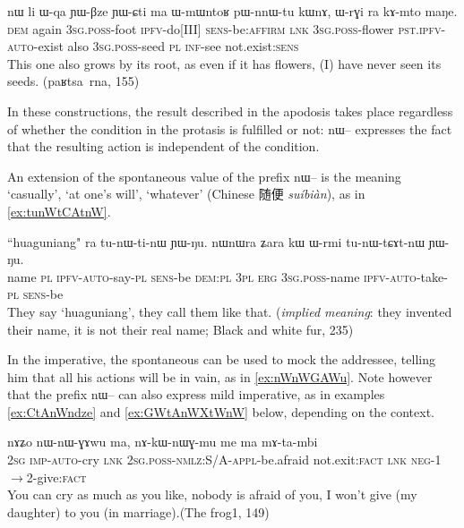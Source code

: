 \documentclass[oldfontcommands,oneside,a4paper,11pt]{article}
\newcommand{\ipa}[1]{{\phon \mbox{#1}}} %
\newcommand{\zh}[1]{{\cn #1}}
\begin{document}
 \begin{exe}
\ex  \label{ex:pWnnWtu.kWnA}
\gll
\ipa{nɯ}    	\ipa{li}    	\ipa{ɯ-qa}    	\ipa{ɲɯ-βze}    	\ipa{ɲɯ-ɕti}    	\ipa{ma}    	\ipa{ɯ-mɯntoʁ}    	\ipa{pɯ-nnɯ-tu}    	\ipa{kɯnɤ,}    	\ipa{ɯ-rɣi}    	\ipa{ra}    	\ipa{kɤ-mto}    	\ipa{maŋe.}    \\
\textsc{dem} again \textsc{3sg.poss}-foot \textsc{ipfv}-do[III] \textsc{sens}-be:\textsc{affirm} \textsc{lnk} \textsc{3sg.poss}-flower \textsc{pst.ipfv-auto}-exist also \textsc{3sg.poss}-seed \textsc{pl} \textsc{inf}-see not.exist:\textsc{sens} \\
\glt This one also grows by its root, as even if it has flowers, (I) have never seen its seeds. (\ipa{paʁtsa rna}, 155)
\end{exe}

In these constructions, the result described in the apodosis takes place regardless of whether the condition in the protasis is fulfilled or not: \ipa{nɯ--} expresses the fact that the resulting action is independent of the condition.

An extension of the spontaneous value of the prefix \ipa{nɯ--} is the meaning `casually', `at one's will', `whatever' (Chinese \zh{随便} \textit{suíbiàn}), as in \ref{ex:tunWtCAtnW}. 

\begin{exe}
\ex \label{ex:tunWtCAtnW}
\gll
``huaguniang" \ipa{ra}  	\ipa{tu-nɯ-ti-nɯ}  	\ipa{ɲɯ-ŋu.}  	\ipa{nɯnɯra}  	\ipa{ʑara}  	\ipa{kɯ}  	\ipa{ɯ-rmi}  	\ipa{tu-nɯ-tɕɤt-nɯ}  	\ipa{ɲɯ-ŋu.}  \\
name \textsc{pl}	\textsc{ipfv-auto}-say-\textsc{pl}	\textsc{sens}-be	\textsc{dem:pl}	\textsc{3pl}	\textsc{erg}	\textsc{3sg.poss}-name	\textsc{ipfv-auto}-take-\textsc{pl}	\textsc{sens}-be\\
\glt They say `huaguniang', they call them like that. (\textit{implied meaning}: they invented their name, it is not their real name; Black and white fur, 235)
\end{exe}

In the imperative, the spontaneous can be used to mock the addressee, telling him that all his actions will be in vain, as in \ref{ex:nWnWGAWu}. Note however that the prefix \ipa{nɯ--} can also express mild imperative, as in examples \ref{ex:CtAnWndze} and \ref{ex:GWtAnWXtWnW} below, depending on the context.

\begin{exe}
\ex \label{ex:nWnWGAWu}
\gll 
\ipa{nɤʑo} 	\ipa{nɯ-nɯ-ɣɤwu} 	\ipa{ma,} 	\ipa{nɤ-kɯ-nɯɣ-mu} 	\ipa{me} 	\ipa{ma} 	\ipa{mɤ-ta-mbi} \\
\textsc{2sg} \textsc{imp-auto}-cry \textsc{lnk} \textsc{2sg.poss-nmlz}:S/A-\textsc{appl}-be.afraid not.exit:\textsc{fact} \textsc{lnk} \textsc{neg}-1$\rightarrow$2-give:\textsc{fact} \\
\glt You can cry as much as you like, nobody is afraid of you, I won't give (my daughter) to you (in marriage).(The frog1, 149)
\end{exe}
\end{document}

